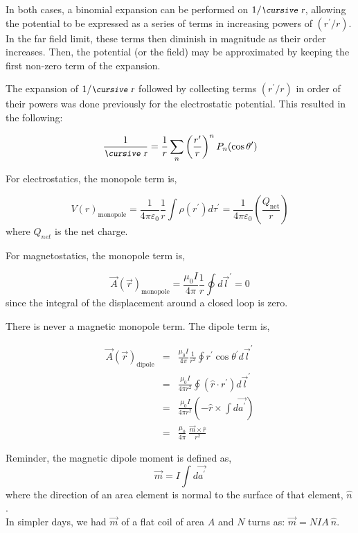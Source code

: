 \documentclass[12pt]{article}
\begin{document}
\begin{flushleft}
In both cases, a binomial expansion can be performed on $1/\text{\small\slshape\cursive r}$, allowing the potential to be expressed as a series of terms in increasing powers of $\left( r^{\prime}/r \right)$.  In the far field limit, these terms then diminish in magnitude as their order increases.  Then, the potential (or the field) may be approximated by keeping the first non-zero term of the expansion.

The expansion of $1/\text{\small\slshape\cursive r}$ followed by collecting terms $\left( r^{\prime}/r \right)$ in order of their powers was done previously for the electrostatic potential.  This resulted in the following:

\[
\frac{1}{\text{\small\slshape\cursive r}} = \frac{1}{r}\sum_{n}\left( \frac{r^{\prime}}{r} \right)^{n} P_{n}(\cos{\theta^{\prime}})
\]

For electrostatics, the monopole term is,

\[
V(r)_{\text{monopole}} = \frac{1}{4\pi\varepsilon_{0}} \frac{1}{r} \int \rho(r^{\prime})d\tau^{\prime} = \frac{1}{4\pi\varepsilon_{0}} \left( \frac{Q_{\text{net}}}{r} \right)
\]
where $Q_{net}$ is the net charge.

For magnetostatics, the monopole term is,

\[
\vec{A}(\vec{r})_{\text{monopole}} = \frac{\mu_{0} I}{4\pi} \frac{1}{r} \oint d\vec{l}^{\prime} = 0
\]
since the integral of the displacement around a closed loop is zero.

There is never a magnetic monopole term. The dipole term is,

\begin{eqnarray}
\vec{A}(\vec{r})_{\text{dipole}} & = & \frac{\mu_{0} I}{4\pi} \frac{1}{r^{2}} \oint r^{\prime}\cos{\theta^{\prime}} d\vec{l}^{\prime} \nonumber \\[4pt]
& = & \frac{\mu_{0} I}{4\pi r^{2}}  \oint ( \hat{r} \cdot r^{\prime} ) d\vec{l}^{\prime} \label{eq:dot} \\[4pt]
& = & \frac{\mu_{0} I}{4\pi r^{2}}  \left( - \hat{r} \times \int d\vec{a^{\prime}} \right) \label{eq:cross} \\[4pt]
& = & \frac{\mu_{0}}{4\pi}  \: \frac{\vec{m} \times \hat{r}}{r^{2}} \label{eq:dipolepot}
\end{eqnarray}

Reminder, the magnetic dipole moment is defined as,
\[
\vec{m} = I \int d\vec{a^{\prime}} 
\]
where the direction of an area element is normal to the surface of that element, $\hat{n}$. \\
In simpler days, we had $\vec{m}$ of a flat coil of area $A$ and $N$ turns as: $\vec{m} = NIA \: \hat{n} $.


\end{flushleft}
\end{document}
